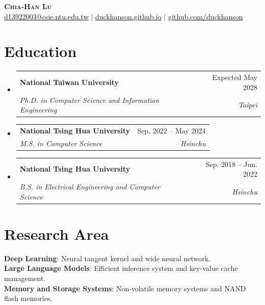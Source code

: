 \documentclass[letterpaper,11pt]{article}
\makeatletter
\newcommand{\resumeSubheading}[4]{
  \vspace{-2pt}\item
    \begin{tabular*}{0.97\textwidth}[t]{l@{\extracolsep{\fill}}r}
      \textbf{#1} & #2 \\
      \textit{\small#3} & \textit{\small #4} \\
    \end{tabular*}\vspace{-7pt}
}
\newcommand{\resumeSubHeadingListStart}{\begin{itemize}[leftmargin=0.15in, label={}]}
\newcommand{\resumeSubHeadingListEnd}{\end{itemize}}
\makeatother
\begin{document}
\begin{center}
    \textbf{\Huge \scshape Chia-Han Lu} \\ \vspace{1pt}
    \small \href{mailto:d13922003@csie.ntu.edu.tw}{\underline{d13922003@csie.ntu.edu.tw}} $|$
    \href{https://duckhanson.github.io}{\underline{duckhanson.github.io}} $|$
    \href{https://github.com/duckhanson}{\underline{github.com/duckhanson}}
\end{center}

\section{Education}
  \resumeSubHeadingListStart
    \resumeSubheading
      {National Taiwan University}{Expected May 2028}
      {Ph.D. in Computer Science and Information Engineering}{Taipei}
    \resumeSubheading
      {National Tsing Hua University}{Sep. 2022 -- May 2024}
      {M.S. in Computer Science}{Hsinchu}
    \resumeSubheading
      {National Tsing Hua University}{Sep. 2018 -- Jun. 2022}
      {B.S. in Electrical Engineering and Computer Science}{Hsinchu}
  \resumeSubHeadingListEnd

\section{Research Area}
 \begin{itemize}[leftmargin=0.15in, label={}]
    \small{\item{
     \textbf{Deep Learning}{: Neural tangent kernel and wide neural network.} \\
     \textbf{Large Language Models}{: Efficient inference system and key-value cache management.} \\
     \textbf{Memory and Storage Systems}{: Non-volatile memory systems and NAND flash memories.}
    }}
 \end{itemize}

\end{document}
